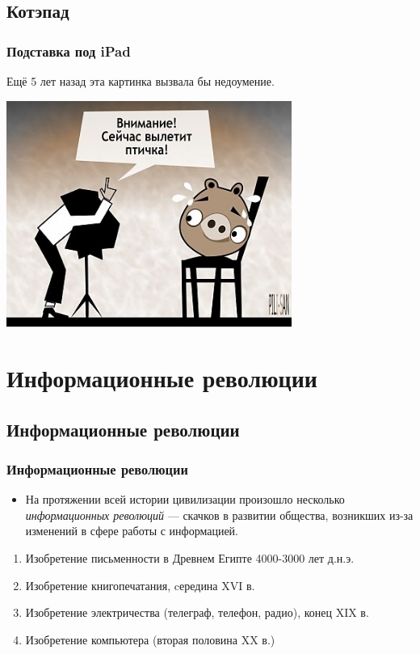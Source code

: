 \documentclass[compress,red]{beamer}
\begin{document}
\subsection{Котэпад}
\begin{frame}[fragile]
\frametitle{Подставка под iPad}
\centerline{Ещё 5 лет назад эта картинка вызвала бы недоумение.}
\vspace{0.5cm}
\centerline{\includegraphics[width=0.7\textwidth]{images/angry_photo.jpg}}
\end{frame}

\section{Информационные революции}
\subsection{Информационные революции}
\begin{frame}[fragile]
  \frametitle{Информационные революции}
  \begin{itemize}
    \item На протяжении всей истории цивилизации произошло несколько \emph{информационных революций} --- скачков в развитии общества, возникших из-за изменений в сфере работы с информацией.
  \end{itemize}
  \begin{enumerate}
    \item Изобретение письменности в Древнем Египте 4000-3000 лет д.н.э.
    \item Изобретение книгопечатания, cередина XVI в.
    \item Изобретение электричества (телеграф, телефон, радио), конец XIX в.
    \item Изобретение компьютера (вторая половина XX в.)
  \end{enumerate}
  
\end{frame}
\end{document}
